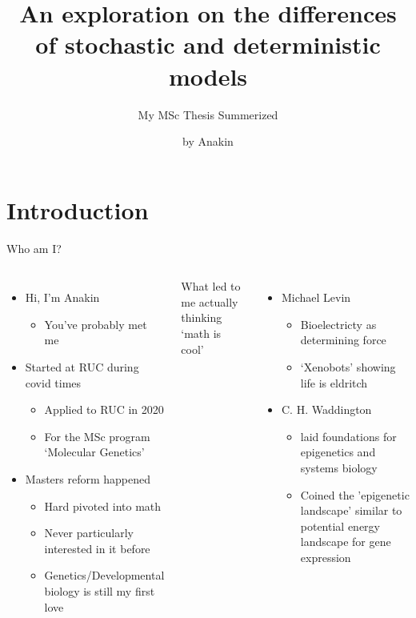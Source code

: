 \documentclass[aspectratio=169,  notheorems, sOuRcEs]{RUCPresentation}
\title{%
    An exploration on the differences of stochastic and
    deterministic models
}
\subtitle{  My MSc Thesis Summerized }
\author{by Anakin}
\newcommand\makebeamertitle{\frame{\maketitle}}%
\begin{document}
\makebeamertitle


\section{Introduction}

\begin{frame}{Who am I?}

    \begin{columns}[T]


        \begin{itemize}[<+->]
            \item Hi, I'm Anakin
                \begin{itemize}[<.->]
                    \item You've probably met me
                \end{itemize}
            \item Started at RUC during covid times
                \begin{itemize}[<.->]
                    \item Applied to RUC in 2020
                    \item For the MSc program `Molecular Genetics'
                \end{itemize}
            \item Masters reform happened
                \begin{itemize}[<.->]
                    \item Hard pivoted into math
                    \item Never particularly interested in it before
                    \item Genetics/Developmental biology is still my first love
                \end{itemize}
        \end{itemize}


        What led to me actually thinking `math is cool'
        \begin{itemize}
            \item Michael Levin
                \begin{itemize}
                    \item Bioelectricty as determining force
                    \item `Xenobots' showing life is eldritch
                \end{itemize}
            \item C. H. Waddington
                \begin{itemize}
                    \item laid foundations for epigenetics and systems biology
                    \item Coined the 'epigenetic landscape' similar to potential
                        energy landscape for gene expression
                \end{itemize}
        \end{itemize}



\end{columns}
\end{frame}
\end{document}
